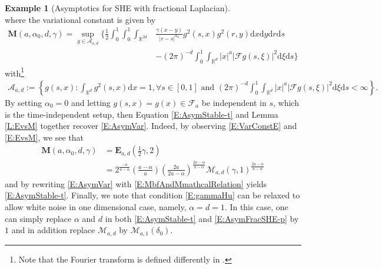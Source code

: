 \documentclass[12pt]{report}
\theoremstyle{plain}
\theoremstyle{definition}
\newtheorem{example}[theorem]{Example}
\numberwithin{equation}{section}
\newcommand{\R}{\mathbb{R}}
\newcommand{\ud}{\ensuremath{ \mathrm{d} }}
\begin{document}
\begin{example}[Asymptotics for SHE with fractional Laplacian]
\begin{equation}
	\end{equation}
	where the variational constant is given by
	\begin{align*}
	\textbf{M}(a,\alpha_0,d,\gamma) = \sup_{g \in \mathcal{A}_{a,d}} \bigg\{ \frac{1}{2} \int_0^1\int_0^1 \int_{\R^{2d}}
	& \frac{\gamma(x-y)}{|r-s|^{\alpha_0}}g^2(s,x)g^2(r,y)  \ud x \ud y \ud r \ud s \\
	& - (2\pi)^{-d} \int_0^1 \int_{\R^d} |x|^a |\mathcal{F}g(s,\xi)|^2 \ud \xi \ud s \bigg\}
	\end{align*}
	with\footnote{Note that the Fourier transform is defined differently in \cite{chen.hu.ea:18:temporal}.}
	\begin{align*}
	\mathcal{A}_{a,d} := \left\{ g(s,x) : \int_{\R^d} g^2(s,x) \ud x = 1, \forall s \in [0,1] \text{ and }
	(2\pi)^{-d} \int_0^1 \int_{\R^d} |x|^a |\mathcal{F}g(s,\xi)|^2 \ud \xi \ud s < \infty \right\}.
	\end{align*}
	By setting $\alpha_0=0$ and letting $g(s,x)=g(x) \in \mathcal{F}_a$ be independent in $s$, which
	is the time-independent setup, then Equation \eqref{E:AsymStable-t} and Lemma \ref{L:EvsM}
	together recover \eqref{E:AsymVar}. Indeed, by observing \eqref{E:VarConstE} and \eqref{E:EvsM},
	we see that
	\begin{align}
	\textbf{M}(a,\alpha_0,d,\gamma)
	& = \mathbf{E}_{a,d}\left(\frac{1}{2}\gamma,2\right) \nonumber \\
	& = 2^{\frac{-a}{a-\alpha}}\left(\frac{a-\alpha}{a}\right)\left( \frac{2a}{2a-\alpha} \right)^{\frac{2a-\alpha}{a-\alpha}}\mathcal{M}_{a,d}
	\left(\gamma,1\right)^{\frac{2a-\alpha}{a-\alpha}} \label{E:MbfAndMmathcalRelation}
	\end{align}
	and by rewriting \eqref{E:AsymVar} with \eqref{E:MbfAndMmathcalRelation} yields
	\eqref{E:AsymStable-t}. Finally, we note that condition \eqref{E:gammaHu} can be relaxed to allow
	white noise in one dimensional case, namely, $\alpha=d=1$. In this case, one can simply replace
	$\alpha$ and $d$ in both \eqref{E:AsymStable-t} and \eqref{E:AsymFracSHE-p} by $1$ and in addition
	replace $\mathcal{M}_{a,d}$ by $\mathcal{M}_{a ,1}(\delta_0)$.
\end{example}
\end{document}

